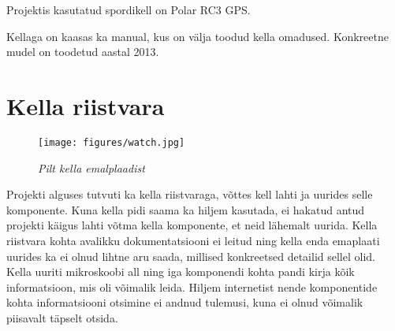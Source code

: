 


Projektis kasutatud spordikell on Polar RC3 GPS.

Kellaga on kaasas ka manual, kus on välja toodud kella omadused.\cite{rc3-man}
Konkreetne mudel on toodetud aastal 2013.

\section{Kella riistvara}\label{sec:riistvara}
\begin{figure}[ht]
    \centering
    \texttt{[image: figures/watch.jpg]}
    \caption{\textit{Pilt kella emalplaadist}}
    \label{fig:watch}
\end{figure}

Projekti alguses tutvuti ka kella riistvaraga, võttes kell lahti ja uurides selle komponente.
Kuna kella pidi saama ka hiljem kasutada, ei hakatud antud projekti käigus lahti võtma kella komponente, et neid lähemalt uurida.
Kella riistvara kohta avalikku dokumentatsiooni ei leitud ning kella enda emaplaati uurides ka ei olnud lihtne aru saada, millised konkreetsed detailid sellel olid.
Kella uuriti mikroskoobi all ning iga komponendi kohta pandi kirja kõik informatsioon, mis oli võimalik leida.
Hiljem internetist nende komponentide kohta informatsiooni otsimine ei andnud tulemusi, kuna ei olnud võimalik piisavalt täpselt otsida.

